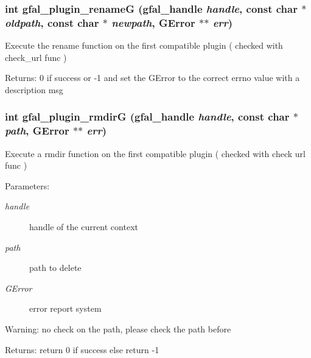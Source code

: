 \subsubsection{\setlength{\rightskip}{0pt plus 5cm}int gfal\_\-plugin\_\-rename\-G (gfal\_\-handle {\em handle}, const char $\ast$ {\em oldpath}, const char $\ast$ {\em newpath}, GError $\ast$$\ast$ {\em err})}\label{gfal__common__plugin_8c_ee26850796f50439ded98dafc7cd064b}


Execute the rename function on the first compatible plugin ( checked with check\_\-url func ) \begin{Desc}
\item[Returns:]0 if success or -1 and set the GError to the correct errno value with a description msg \end{Desc}
\subsubsection{\setlength{\rightskip}{0pt plus 5cm}int gfal\_\-plugin\_\-rmdir\-G (gfal\_\-handle {\em handle}, const char $\ast$ {\em path}, GError $\ast$$\ast$ {\em err})}\label{gfal__common__plugin_8c_d3bcfafdf8d90935cb312388cdd6bb92}


Execute a rmdir function on the first compatible plugin ( checked with check url func ) \begin{Desc}
\item[Parameters:]
\begin{description}
\item[{\em handle}]handle of the current context \item[{\em path}]path to delete \item[{\em GError}]error report system \end{description}
\end{Desc}
\begin{Desc}
\item[Warning:]no check on the path, please check the path before \end{Desc}
\begin{Desc}
\item[Returns:]return 0 if success else return -1 \end{Desc}
